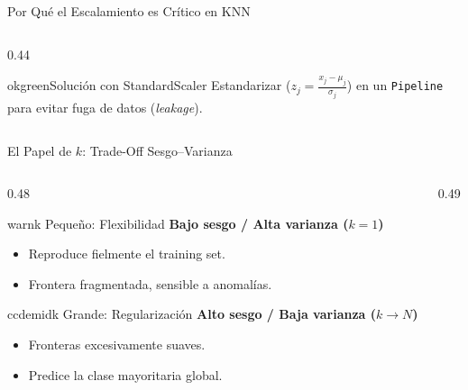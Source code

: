 \begin{frame}{Por Qué el Escalamiento es Crítico en KNN}
\begin{columns}[T,onlytextwidth]
\begin{column}{0.44\textwidth}
\vspace{0.08cm}
\begin{contrastbox}{okgreen}{Solución con StandardScaler}
Estandarizar ($z_j = \frac{x_j - \mu_j}{\sigma_j}$) en un \texttt{Pipeline} para evitar fuga de datos (\textit{leakage}).
\end{contrastbox}
\end{column}
\end{columns}
\end{frame}

\begin{frame}{El Papel de $k$: Trade-Off Sesgo--Varianza}
\begin{columns}[T,onlytextwidth]
\begin{column}{0.48\textwidth}
\begin{contrastbox}{warn}{k Pequeño: Flexibilidad}
\scriptsize
\textbf{Bajo sesgo / Alta varianza ($k=1$)}
\begin{itemize}\setlength{\itemsep}{0.10em}
  \item Reproduce fielmente el training set.
  \item Frontera fragmentada, sensible a anomalías.
\end{itemize}
\end{contrastbox}

\vspace{0.08cm}
\begin{contrastbox}{ccdemid}{k Grande: Regularización}
\scriptsize
\textbf{Alto sesgo / Baja varianza ($k \to N$)}
\begin{itemize}\setlength{\itemsep}{0.10em}
  \item Fronteras excesivamente suaves.
  \item Predice la clase mayoritaria global.
\end{itemize}
\end{contrastbox}
\end{column}

\begin{column}{0.49\textwidth}
\centering
{}
\end{column}
\end{columns}
\end{frame}
